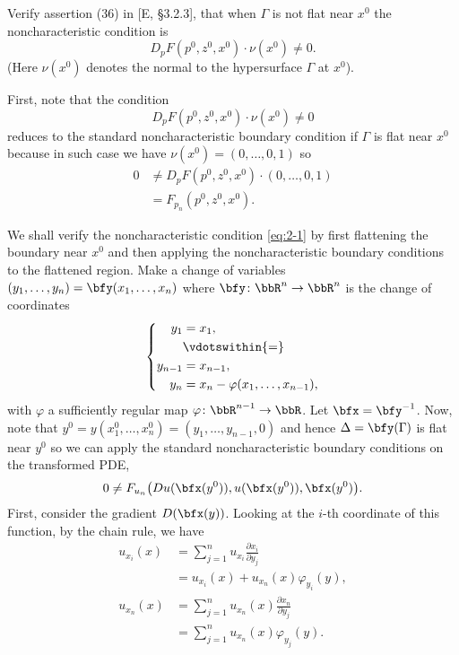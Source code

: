 \begin{problem}
  Verify assertion (36) in [E, \S 3.2.3], that when \(\Gamma\) is not flat
  near \(x^0\) the noncharacteristic condition is
  \[
    D_pF(p^0,z^0,x^0)\cdot \nu(x^0)\neq 0.
  \]
  (Here \(\nu(x^0)\) denotes the normal to the hypersurface \(\Gamma\) at
  \(x^0\)).
\end{problem}
\begin{solution}
  First, note that the condition
  \begin{equation}
    \label{eq:2-1}
    D_pF(p^0,z^0,x^0)\cdot \nu(x^0)\neq 0
  \end{equation}
  reduces to the standard noncharacteristic boundary condition if
  \(\Gamma\) is flat near \(x^0\) because in such case we have
  \(\nu(x^0)=(0,\dotsc,0,1)\) so
  \begin{align*}
    0&\neq D_pF(p^0,z^0,x^0)\cdot (0,\dotsc,0,1)\\
     &=F_{p_n}(p^0,z^0,x^0).
  \end{align*}

  We shall verify the noncharacteristic condition \eqref{eq:2-1} by first
  flattening the boundary near \(x^0\) and then applying the
  noncharacteristic boundary conditions to the flattened region. Make a
  change of variables \((y_1,\dotsc,y_n)=\bfy(x_1,\dotsc,x_n)\) where
  \(\bfy\colon\bbR^n\to\bbR^n\) is the change of coordinates
  \[
    \left\{
      \begin{aligned}
        y_1&=x_1,\\
        &\vdotswithin{=}\\
        y_{n-1}&=x_{n-1},\\
        y_n&=x_n-\varphi(x_1,\dotsc,x_{n-1}),
      \end{aligned}
    \right.
  \]
  with \(\varphi\) a sufficiently regular map
  \(\varphi\colon\bbR^{n-1}\to\bbR\). Let \(\bfx=\bfy^{-1}\). Now, note
  that \(y^0=y(x_1^0,\dotsc,x_n^0)=(y_1,\dotsc,y_{n-1},0)\) and hence
  \(\Delta=\bfy(\Gamma)\) is flat near \(y^0\) so we can apply the standard
  noncharacteristic boundary conditions on the transformed PDE,
  \[
    0\neq F_{u_n}\bigl(Du(\bfx(y^0)),u(\bfx(y^0)),\bfx(y^0)\bigr).
  \]
  First, consider the gradient \(D(\bfx(y))\). Looking at the \(i\)-th
  coordinate of this function, by the chain rule, we have
  \begin{align*}
    u_{x_i}(x)
    &=\sum_{j=1}^n u_{x_i}\frac{\partial x_i}{\partial y_j}\\
    &=u_{x_i}(x)+u_{x_n}(x)\varphi_{y_i}(y),\\
    u_{x_n}(x)
    &=\sum_{j=1}^nu_{x_n}(x)\frac{\partial x_n}{\partial y_j}\\
    &=\sum_{j=1}^nu_{x_n}(x)\varphi_{y_j}(y).
  \end{align*}
\end{solution}
\newpage

